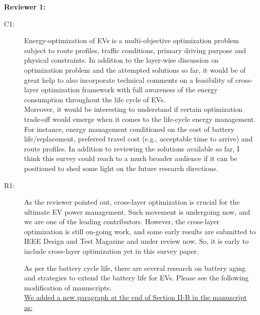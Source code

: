\documentclass[onecolumn]{IEEEconf}
\begin{document}
\setlength{\parindent}{0cm}
\textbf{Reviewer 1:}
\begin{description}
\item [C1: ] Energy-optimization of EVs is a multi-objective optimization problem subject to route profiles, traffic conditions, primary driving purpose and physical constraints. In addition to the layer-wise discussion on optimization problem and the attempted solutions so far, it would be of great help to also incorporate technical comments on a feasibility of cross-layer optimization framework with full awareness of the energy consumption throughout the life cycle of EVs.\\ 
Moreover, it would be interesting to understand if certain optimization trade-off would emerge when it comes to the life-cycle energy management. For instance, energy management conditioned on the cost of battery life/replacement, preferred travel cost (e.g., acceptable time to arrive) and route profiles. In addition to reviewing  the solutions available so far, I think this survey could reach to a much broader audience if it can be positioned to shed some light on the future research directions.
\item [R1: ] As the reviewer pointed out, cross-layer optimization is crucial for the ultimate EV power management. Such movement is undergoing now, and we are one of the leading contributors. However, the cross-layer optimization is still on-going work, and some early results are submitted to  IEEE Design and Test Magazine and under review now. So, it is early to include cross-layer optimization yet in this survey paper. 

As per the battery cycle life, there are several research on battery aging and strategies to extend the battery life for EVs.  Please see the following modification of manuscripts.\\

\underline{We added a new paragraph at the end of Section II-B in the manuscript as:}\\


\end{description}
\end{document}
